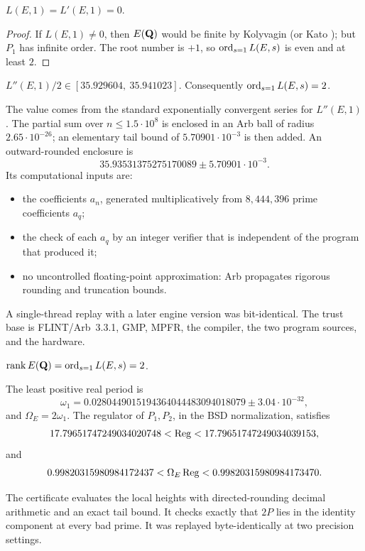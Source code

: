 \begin{proposition}\label{prop:vanish}
$L(E,1)=L'(E,1)=0$.
\end{proposition}
\begin{proof}
If $L(E,1)\neq0$, then $E(\mathbf{Q})$ would be finite by Kolyvagin \cite{kolyvagin} (or Kato \cite{kato}); but $P_1$ has infinite order. The root number is $+1$, so $\operatorname{ord}_{s=1}L(E,s)$ is even and at least $2$.
\end{proof}

\begin{theorem}\label{thm:lpp}
$L''(E,1)/2\in[35.929604,\ 35.941023]$. Consequently $\operatorname{ord}_{s=1}L(E,s)=2$.
\end{theorem}
The value comes from the standard exponentially convergent series for $L''(E,1)$ \cite[\S2.13]{cremona}. The partial sum over $n\le1.5\cdot10^8$ is enclosed in an Arb ball \cite{arb} of radius $2.65\cdot10^{-26}$; an elementary tail bound of $5.70901\cdot10^{-3}$ is then added. An outward-rounded enclosure is
\[
35.93531375275170089\pm5.70901\cdot10^{-3}.
\]
Its computational inputs are:
\begin{itemize}[leftmargin=*]
\item the coefficients $a_n$, generated multiplicatively from $8{,}444{,}396$ prime coefficients $a_q$;
\item the check of each $a_q$ by an integer verifier that is independent of the program that produced it;
\item no uncontrolled floating-point approximation: Arb propagates rigorous rounding and truncation bounds.
\end{itemize}
A single-thread replay with a later engine version was bit-identical. The trust base is FLINT/Arb~3.3.1, GMP, MPFR, the compiler, the two program sources, and the hardware.

\begin{theorem}\label{thm:rank}
$\operatorname{rank} E(\mathbf{Q})=\operatorname{ord}_{s=1}L(E,s)=2$.
\end{theorem}

\begin{theorem}\label{thm:reg}
The least positive real period is
\[
\omega_1=0.0280449015194364044483094018079\pm3.04\cdot10^{-32},
\]
and $\Omega_E=2\omega_1$. The regulator of $P_1,P_2$, in the BSD normalization, satisfies
\[
17.79651747249034020748<\operatorname{Reg}<17.79651747249034039153,
\]
and
\[
0.99820315980984172437<\Omega_E\operatorname{Reg}<0.99820315980984173470 .
\]
\end{theorem}
The certificate evaluates the local heights with directed-rounding decimal arithmetic and an exact tail bound. It checks exactly that $2P$ lies in the identity component at every bad prime. It was replayed byte-identically at two precision settings.

